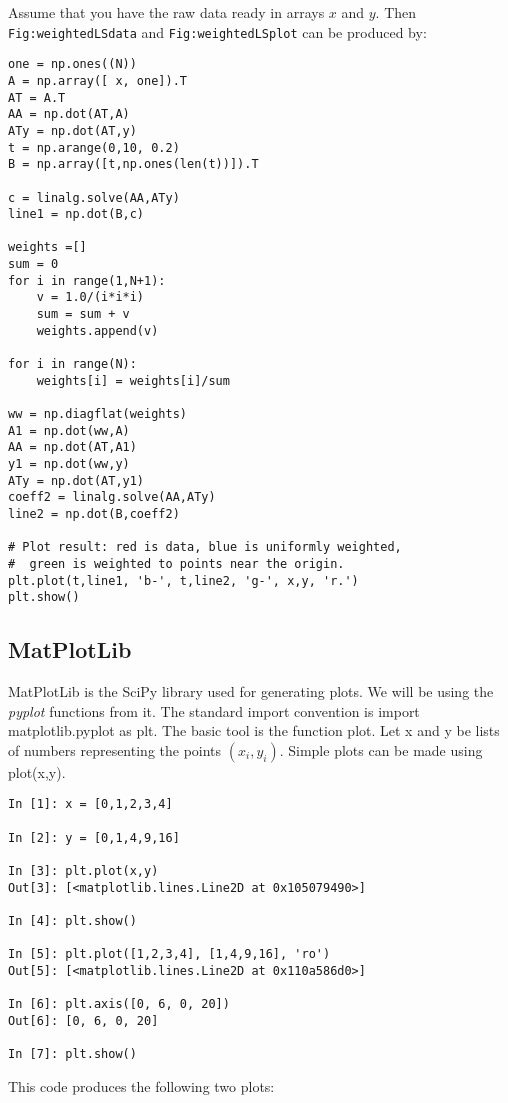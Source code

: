 Assume that you have the raw data ready in arrays \(x\) and \(y\). Then
\texttt{Fig:weightedLSdata} and \texttt{Fig:weightedLSplot} can be
produced by:

\begin{verbatim}
one = np.ones((N))
A = np.array([ x, one]).T
AT = A.T
AA = np.dot(AT,A)
ATy = np.dot(AT,y)
t = np.arange(0,10, 0.2)
B = np.array([t,np.ones(len(t))]).T

c = linalg.solve(AA,ATy)
line1 = np.dot(B,c)

weights =[]
sum = 0
for i in range(1,N+1):
    v = 1.0/(i*i*i)
    sum = sum + v
    weights.append(v)

for i in range(N):
    weights[i] = weights[i]/sum

ww = np.diagflat(weights)
A1 = np.dot(ww,A)
AA = np.dot(AT,A1)
y1 = np.dot(ww,y)
ATy = np.dot(AT,y1)
coeff2 = linalg.solve(AA,ATy)
line2 = np.dot(B,coeff2)

# Plot result: red is data, blue is uniformly weighted,
#  green is weighted to points near the origin.
plt.plot(t,line1, 'b-', t,line2, 'g-', x,y, 'r.')
plt.show()
\end{verbatim}

\hypertarget{matplotlib}{%
\subsection{MatPlotLib}\label{matplotlib}}

MatPlotLib is the SciPy library used for generating plots. We will be
using the \emph{pyplot} functions from it. The standard import
convention is import matplotlib.pyplot as plt. The basic tool is the
function plot. Let x and y be lists of numbers representing the points
\((x_i , y_i)\). Simple plots can be made using plot(x,y).

\begin{verbatim}
In [1]: x = [0,1,2,3,4]

In [2]: y = [0,1,4,9,16]

In [3]: plt.plot(x,y)
Out[3]: [<matplotlib.lines.Line2D at 0x105079490>]

In [4]: plt.show()

In [5]: plt.plot([1,2,3,4], [1,4,9,16], 'ro')
Out[5]: [<matplotlib.lines.Line2D at 0x110a586d0>]

In [6]: plt.axis([0, 6, 0, 20])
Out[6]: [0, 6, 0, 20]

In [7]: plt.show()
\end{verbatim}

This code produces the following two plots:

